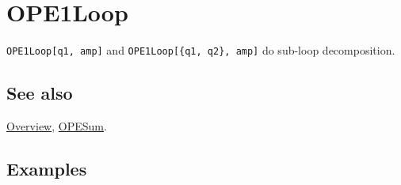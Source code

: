 \documentclass[../FeynCalcManual.tex]{subfiles}
\begin{document}
\hypertarget{ope1loop}{
\section{OPE1Loop}\label{ope1loop}}

\texttt{OPE1Loop[\allowbreak{}q1,\ \allowbreak{}amp]} and
\texttt{OPE1Loop[\allowbreak{}\{\allowbreak{}q1,\ \allowbreak{}q2\},\ \allowbreak{}amp]}
do sub-loop decomposition.

\subsection{See also}

\hyperlink{toc}{Overview}, \hyperlink{opesum}{OPESum}.

\subsection{Examples}
\end{document}
